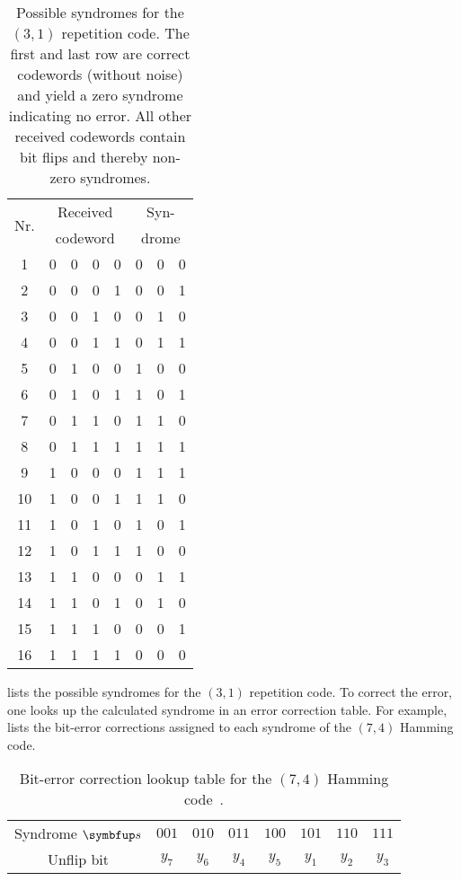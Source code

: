 \begin{table}[htb]
	\centering
	\begin{tabular}{c|cccc|ccc}
		\toprule
		\multirow{2}{*}{Nr.} & \multicolumn{4}{c}{Received} & \multicolumn{3}{c}{Syn-} \\
		& \multicolumn{4}{c}{codeword} & \multicolumn{3}{c}{drome} \\
		\midrule
			1 & 0 & 0 & 0 & 0 & 0 & 0 & 0 \\
			2 & 0 & 0 & 0 & 1 & 0 & 0 & 1 \\
			3 & 0 & 0 & 1 & 0 & 0 & 1 & 0 \\
			4 & 0 & 0 & 1 & 1 & 0 & 1 & 1 \\
			5 & 0 & 1 & 0 & 0 & 1 & 0 & 0 \\
			6 & 0 & 1 & 0 & 1 & 1 & 0 & 1 \\
			7 & 0 & 1 & 1 & 0 & 1 & 1 & 0 \\
			8 & 0 & 1 & 1 & 1 & 1 & 1 & 1 \\
			9 & 1 & 0 & 0 & 0 & 1 & 1 & 1 \\
			10 & 1 & 0 & 0 & 1 & 1 & 1 & 0 \\
			11 & 1 & 0 & 1 & 0 & 1 & 0 & 1 \\
			12 & 1 & 0 & 1 & 1 & 1 & 0 & 0 \\
			13 & 1 & 1 & 0 & 0 & 0 & 1 & 1 \\
			14 & 1 & 1 & 0 & 1 & 0 & 1 & 0 \\
			15 & 1 & 1 & 1 & 0 & 0 & 0 & 1 \\
			16 & 1 & 1 & 1 & 1 & 0 & 0 & 0 \\
		\bottomrule
	\end{tabular}
	\caption{Possible syndromes for the $(3,1)$ repetition code. The first and last row are correct codewords (without noise) and yield a zero syndrome indicating no error. All other received codewords contain bit flips and thereby non-zero syndromes.}\label{tab:repetition_syndromes}
\end{table}
 lists the possible syndromes for the $(3,1)$ repetition code.
To correct the error, one looks up the calculated syndrome in an error correction table.
For example,  lists the bit-error corrections assigned to each syndrome of the $(7,4)$ Hamming code.
\begin{table}[htb]
	\centering
	\begin{tabular}{cccccccc}
		\toprule
		Syndrome $\vb{s}$ & $001$ & $010$ & $011$ & $100$ & $101$ & $110$ & $111$ \\
		Unflip bit & $y_7$ & $y_6$ & $y_4$ & $y_5$ & $y_1$ & $y_2$ & $y_3$ \\
		\bottomrule
	\end{tabular}
	\caption{Bit-error correction lookup table for the $(7,4)$ Hamming code~\cite[p.~11]{MacKay2003}.}\label{tab:hamming_correction}
\end{table}

